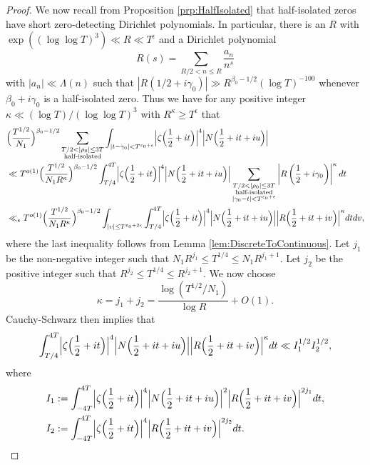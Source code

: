 \documentclass[12pt]{amsart}
\theoremstyle{plain}
\theoremstyle{definition}
\theoremstyle{remark}
\begin{document}
\begin{proof}
We now recall from Proposition \ref{prp:HalfIsolated} that half-isolated zeros have short zero-detecting Dirichlet polynomials. In particular, there is an $R$ with $\exp ((\log \log T)^3) \ll R \ll T^\epsilon$ and a Dirichlet polynomial
\[
R(s)=\sum_{R/2 < n \leq R}\frac{a_n}{n^s}
\]
with $|a_n|\ll \Lambda(n)$ such that $|R(1/2+i\gamma_0)|\gg R^{\beta_0-1/2}(\log T)^{-100}$ whenever $\beta_0+i\gamma_0$ is a half-isolated zero. Thus we have for any positive integer $\kappa \ll (\log T)/(\log \log T)^3$ with $R^\kappa \geq T^\epsilon$ that
\begin{align*}
&\Bigl(\frac{T^{1/2}}{N_1}\Bigr)^{\beta_0-1/2}\sum_{\substack{T/2<|\rho_0|\leq 3T\\ \text{half-isolated} }}\int_{|t-\gamma_0|<T^{\varepsilon_0 + \epsilon}} \Bigl| \zeta \Bigl(\frac{1}{2}+it \Bigr) \Bigr|^{4}\Bigl|N\Bigl(\frac{1}{2}+it+iu\Bigr)\Bigr|\\
&\ll T^{o(1)} \Bigl(\frac{T^{1/2}}{N_1 R^{\kappa}}\Bigr)^{\beta_0-1/2}\int_{T/4}^{4T} \Bigl| \zeta \Bigl(\frac{1}{2}+it \Bigr) \Bigr|^{4}\Bigl|N\Bigl(\frac{1}{2}+it+iu\Bigr)\Bigr| \sum_{\substack{T/2<|\rho_0|\leq 3T\\ \text{half-isolated} \\ |\gamma_0-t| < T^{\varepsilon_0 + \epsilon}}} \left|R \left( \frac{1}{2}+i\gamma_0 \right) \right|^\kappa dt\\
&\ll_\epsilon  T^{o(1)} \Bigl(\frac{T^{1/2}}{N_1 R^{\kappa}}\Bigr)^{\beta_0-1/2}\int_{|v|\leq T^{\varepsilon_0+2\epsilon}}\int_{T/4}^{4T} \Bigl| \zeta \Bigl(\frac{1}{2}+it \Bigr) \Bigr|^{4}\Bigl|N\Bigl(\frac{1}{2}+it+iu\Bigr)\Bigr| \Bigl|R\Bigl(\frac{1}{2}+it+iv\Bigr)\Bigr|^{\kappa}dt dv,
\end{align*}
where the last inequality follows from Lemma \ref{lem:DiscreteToContinuous}. Let $j_1$ be the non-negative integer such that $N_1 R^{j_1}\le T^{1/4}\le N_1 R^{j_1+1}$. Let $j_2$ be the positive integer such that $R^{j_2}\le T^{1/4}\le R^{j_2+1}$. We now choose
\[
\kappa=j_1+j_2=\frac{\log(T^{1/2}/N_1)}{\log{R}}+O(1).
\]
Cauchy-Schwarz then implies that
\[
\int_{T/4}^{4T} \Bigl| \zeta \Bigl(\frac{1}{2}+it \Bigr) \Bigr|^{4}\Bigl|N\Bigl(\frac{1}{2}+it+iu\Bigr)\Bigr| \Bigl|R\Bigl(\frac{1}{2}+it+iv\Bigr)\Bigr|^{\kappa}dt\ll I_1^{1/2}I_2^{1/2},
\]
where
\begin{align*}
I_1&:=\int_{-4T}^{4T} \Bigl| \zeta \Bigl(\frac{1}{2}+it \Bigr) \Bigr|^{4}\Bigl|N\Bigl(\frac{1}{2}+it+iu\Bigr)\Bigr|^{2} \Bigl|R\Bigl(\frac{1}{2}+it+iv\Bigr)\Bigr|^{2j_1}dt,\\
I_2&:=\int_{-4T}^{4T} \Bigl| \zeta \Bigl(\frac{1}{2}+it \Bigr) \Bigr|^{4}\Bigl|R\Bigl(\frac{1}{2}+it+iv\Bigr)\Bigr|^{2j_2}dt.

\end{align*}
\end{proof}
\end{document}
